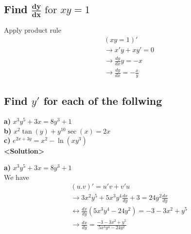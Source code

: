 \documentclass{article}
\begin{document}
\begin{multicols}{2}
\subsection{Find $\mathbf{\frac{dy}{dx}} \text{ for } xy=1$}
\noindent Apply product rule
\begin{align*}
    &(xy=1)' \\
    &\rightarrow x'y + xy' = 0 \\
    &\rightarrow \frac{dy}{dx}y = -x \\
    &\rightarrow \frac{dy}{dx}= -\frac{x}{y}
\end{align*}

\end{multicols}

\subsection{Find $y'$ for each of the follwing}
\textbf{a)} $x^3y^5 + 3x = 8y^3+1$ \\
\textbf{b)} $x^2\tan(y) + y^{10}\sec(x)=2x$ \\
\textbf{c)} $e^{2x+3y} = x^2 - \ln(xy^3)$ \\

\textbf{<Solution>} \par

\textbf{a)} $x^3y^5 + 3x = 8y^3+1$ \\
We have
\begin{align*}
    &(u.v)'=u'v+v'u \\
    &\rightarrow 3x^2y^5 + 5x^3y^4\frac{dx}{dy} + 3 = 24y^2\frac{dx}{dy} \\
    &\leftrightarrow \frac{dx}{dy}(5x^3y^4 - 24y^2) = -3 - 3x^2 + y^5 \\
    &\rightarrow \frac{dx}{dy} = \frac{-3 - 3x^2 + y^5}{5x^3y^4 - 24y^2}
\end{align*}
\end{document}
